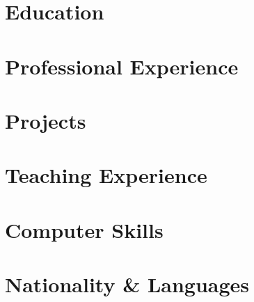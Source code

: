 \documentclass{resume}
\begin{document}
    

\section{Education}
    
    

\section{Professional Experience}
    
    

\section{Projects}
    
    

\section{Teaching Experience}
    
    

\section{Computer Skills}
    
    
    
    
\section{Nationality \& Languages}
	
\end{document}
